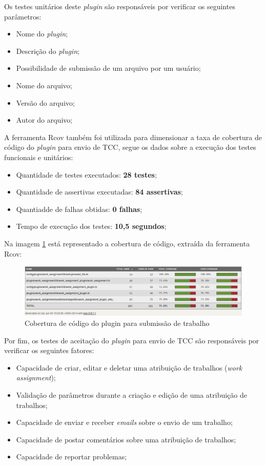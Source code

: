 Os testes unitários deste \textit{plugin} são responsáveis por verificar os seguintes parâmetros:

\begin{itemize}
\item Nome do \textit{plugin};
\item Descrição do \textit{plugin};
\item Possibilidade de submissão de um arquivo por um usuário;
\item Nome do arquivo;
\item Versão do arquivo;
\item Autor do arquivo;
\end{itemize}

A ferramenta Rcov também foi utilizada para dimensionar a taxa de cobertura de código do \textit{plugin} para envio de TCC, segue os dados sobre a execução dos testes funcionais e unitários:

\begin{itemize}
\item Quantidade de testes executados: \textbf{28 testes};
\item Quantidade de assertivas executadas: \textbf{84 assertivas};
\item Quantiadde de falhas obtidas: \textbf{0 falhas};
\item Tempo de execução dos testes: \textbf{10,5 segundos};
\end{itemize}

Na imagem \ref{consideracoes_cobertura2} está representado a cobertura de código, extraída da ferramenta Rcov:

\begin{figure}[!h]
    \centering
    \includegraphics[keepaspectratio=false,scale=0.45]
      {figuras/cobertura_tcc.eps}
    \caption{Cobertura de código do plugin para submissão de trabalho}
    \label{consideracoes_cobertura2}
\end{figure}

Por fim, os testes de aceitação do \textit{plugin} para envio de TCC são responsáveis por verificar os seguintes fatores:

\begin{itemize}
\item Capacidade de criar, editar e deletar uma atribuição de trabalhos (\textit{work assignment});
\item Validação de parâmetros durante a criação e edição de uma atribuição de trabalhos;
\item Capacidade de enviar e receber \textit{emails} sobre o envio de um trabalho;
\item Capacidade de postar comentários sobre uma atribuição de trabalhos;
\item Capacidade de reportar problemas;
\end{itemize}

